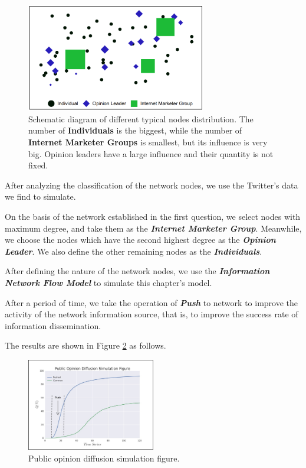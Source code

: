 \documentclass[a4paper,11pt]{article}
\begin{document}
\begin{figure}[h]%
    \centering 
    \includegraphics[width=0.7\textwidth]{./Pic/Unknown.png}
    \caption{Schematic diagram of different typical nodes distribution. The number of \textbf{Individuals} is the biggest, while the number of \textbf{Internet Marketer Groups} is smallest, but its influence is very big. Opinion leaders have a large influence and their quantity is not fixed.}
    \label{fig:Unknown}  
\end{figure}

\par After analyzing the classification of the network nodes, we use the Twitter's data we find to simulate.
\par On the basis of the network established in the first question, we select nodes with maximum degree, and take them as the \textbf{\emph{Internet Marketer Group}}. Meanwhile, we choose the nodes which have the second highest degree as the \textbf{\emph{Opinion Leader}}. We also define the other remaining nodes as the \textbf{\emph{Individuals}}.
\par After defining the nature of the network nodes, we use the \textbf{\emph{Information Network Flow Model}} to simulate this chapter's model.
\par After a period of time, we take the operation of \textbf{\emph{Push}} to network to improve the activity of the network information source, that is, to improve the success rate of information dissemination.
\par The results are shown in Figure \ref{fig:P4} as follows.


\begin{figure}[h]%
    \centering 
    \includegraphics[width=0.5\textwidth]{./Pic/P4.jpg}
    \caption{Public opinion diffusion simulation figure.}
    \label{fig:P4}  
\end{figure}
\end{document}
